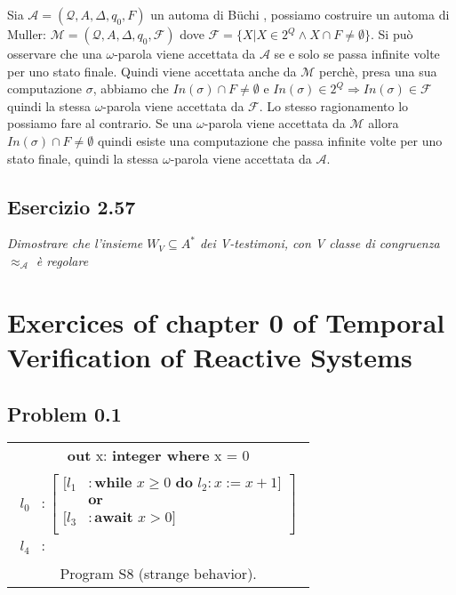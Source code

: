 \documentclass[12pt]{article}
\newcommand{\A}{\ensuremath{\mathcal{A}}\xspace}
\newcommand{\Buchi}{\ensuremath{\mathcal{A} = (\mathcal{Q},A,\Delta,q_0,F)}\xspace}
\newcommand{\buchi}{B\"uchi }
\begin{document}
Sia $\Buchi$ un automa di \buchi, possiamo costruire un automa di Muller: $\mathcal{M} = (\mathcal{Q},A,\Delta,q_0,\mathcal{F})$ dove $\mathcal{F} = \{ X | X \in 2^Q \land X \cap F \neq \emptyset\}$. Si può osservare che una $\omega$-parola viene accettata da $\A$ se e solo se passa infinite volte per uno stato finale. Quindi viene accettata anche da $\mathcal{M}$ perchè, presa una sua computazione $\sigma$, abbiamo che $In(\sigma) \cap F \neq \emptyset $ e $ In(\sigma) \in 2^Q \Rightarrow In(\sigma) \in \mathcal{F}$ quindi la stessa $\omega$-parola viene accettata da $\mathcal{F}$. Lo stesso ragionamento lo possiamo fare al contrario. Se una $\omega$-parola viene accettata da $\mathcal{M}$ allora $In(\sigma) \cap F \neq \emptyset $ quindi esiste una computazione che passa infinite volte per uno stato finale, quindi 
la stessa $\omega$-parola viene accettata da $\A$. 

\subsection*{Esercizio 2.57}
\textit{Dimostrare che l'insieme $W_V\subseteq A^*$ dei V-testimoni, con V classe di congruenza $\approx_\mathcal{A}$ è regolare}



\newpage
\section{Exercices of chapter 0 of Temporal Verification of Reactive Systems}
\subsection*{Problem 0.1}
\begin{center}
\begin{tabular}{|c|}
\hline
\textbf{out} x: \textbf{integer where} x = 0 \\

\parbox{4cm}{
  \begin{align*}
    l_0 &: \left[ \begin{aligned}
 		[l_1 &: \textbf{while }x \geq 0 \textbf{ do } l_2: x := x+1]\\ 
 		&\textbf{or} \\ 
 		[l_3 &: \textbf{await } x > 0] \\
		\end{aligned} \right]\\
 	l_4 &:
  \end{align*}}\\
Program S8 (strange behavior). \\
\hline
\end{tabular}
\end{center}
\end{document}
